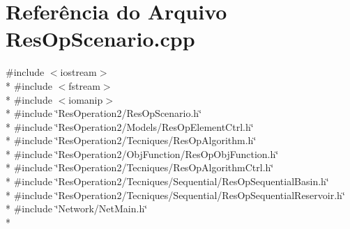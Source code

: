 \section{Referência do Arquivo Res\+Op\+Scenario.\+cpp}
\label{_res_op_scenario_8cpp}
{\ttfamily \#include $<$iostream$>$}\\*
{\ttfamily \#include $<$fstream$>$}\\*
{\ttfamily \#include $<$iomanip$>$}\\*
{\ttfamily \#include \char`\"{}Res\+Operation2/\+Res\+Op\+Scenario.\+h\char`\"{}}\\*
{\ttfamily \#include \char`\"{}Res\+Operation2/\+Models/\+Res\+Op\+Element\+Ctrl.\+h\char`\"{}}\\*
{\ttfamily \#include \char`\"{}Res\+Operation2/\+Tecniques/\+Res\+Op\+Algorithm.\+h\char`\"{}}\\*
{\ttfamily \#include \char`\"{}Res\+Operation2/\+Obj\+Function/\+Res\+Op\+Obj\+Function.\+h\char`\"{}}\\*
{\ttfamily \#include \char`\"{}Res\+Operation2/\+Tecniques/\+Res\+Op\+Algorithm\+Ctrl.\+h\char`\"{}}\\*
{\ttfamily \#include \char`\"{}Res\+Operation2/\+Tecniques/\+Sequential/\+Res\+Op\+Sequential\+Basin.\+h\char`\"{}}\\*
{\ttfamily \#include \char`\"{}Res\+Operation2/\+Tecniques/\+Sequential/\+Res\+Op\+Sequential\+Reservoir.\+h\char`\"{}}\\*
{\ttfamily \#include \char`\"{}Network/\+Net\+Main.\+h\char`\"{}}\\*
